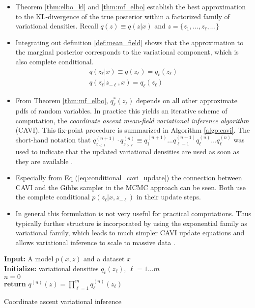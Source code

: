 \begin{itemize}
\item  Theorem \ref{thm:elbo_kl} and \ref{thm:mf_elbo} establish the best approximation to the KL-divergence of the true posterior within a factorized family of variational densities. Recall $q(z)\equiv q(z|x)$ and $z=\{z_1,\dots,z_\ell, \dots\}$
\item Integrating out definition \ref{def:mean_field} shows that the approximation to the marginal posterior corresponds to the variational component, which is also complete conditional. 
\begin{align}
	q(z_\ell | x) \equiv  q(z_\ell) = q_\ell(z_\ell) \\ 
	q(z_\ell | z_{-\ell}, x) = q_\ell(z_\ell) 
\end{align}
\item   From Theorem \ref{thm:mf_elbo},  $q^*_\ell(z_\ell)$  depends on all other  approximate pdfs of random variables. In practice this yields an iterative scheme of computation, the \textit{coordinate ascent mean-field variational inference algorithm} (CAVI)\cite{blei2016variational, Bishop:2006:PRM:1162264}. This fix-point procedure is summarized in Algorithm \ref{algo:cavi}. The short-hand notation that
$q^{(n+1)}_{z_{<\ell}}\cdot q^{(n)}_{z_{>\ell}} \equiv q^{(n+1)}_1 \dots q^{(n+1)}_{\ell-1} q^{(n)}_{\ell} \dots q^{(n)}_{\ell} $ was used to indicate that the updated variational densities are used as soon as they are available \cite{Bishop:2006:PRM:1162264}. 

\item Especially from Eq (\ref{eq:conditional_cavi_update}) the connection between CAVI and the Gibbs sampler in the MCMC approach \cite{doi:10.1080/01621459.1990.10476213, Geman:1984:SRG:2286442.2286617} can be seen. Both use the complete conditional $p(z_\ell | x, z_{-\ell})$ in their update steps.	

\item  In general this formulation is not very useful for  practical computations. Thus  typically further structure is incorporated by using the exponential family as variational family, which leads to much simpler CAVI update equations and allows variational inference to scale to massive data \cite{blei2016variational, Bernardo03thevariational, MAL-001}.
\end{itemize}
 \begin{algorithm}[t] \label{algo:cavi}
 	\SetAlgoLined
 	\textbf{Input:} A model $p(x,z)$ and a dataset $x$ \\
 	\textbf{Initialize:} variational densities $q_\ell(z_\ell), ~ \ell = 1 \dots m$ \\
 	$n = 0$ \\
 \textbf{return }$q^{(n)}(z) = \prod_{\ell =1}^{m} q^{(n)}_\ell(z_\ell)$
 	\caption{Coordinate ascent variational inference}
 \end{algorithm} 

